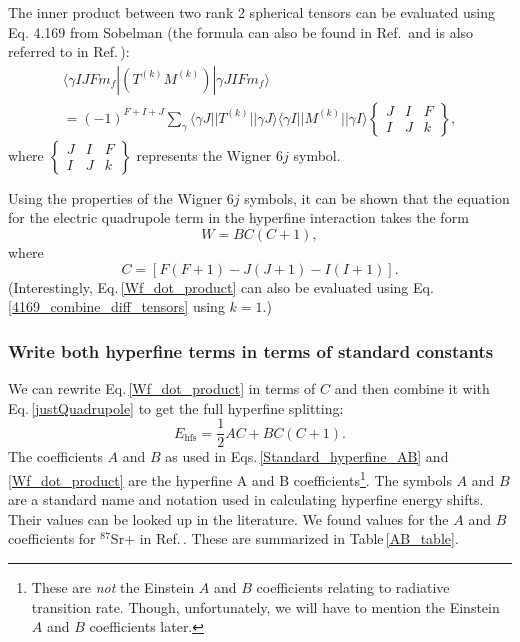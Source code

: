 The inner product between two rank 2 spherical tensors can be evaluated using Eq. 4.169 from Sobelman \cite{sobelman_spectra} (the formula can also be found in Ref.\,\cite{Racah2} and is also referred to in Ref.\,\cite{schwartz_hyperfine_expansion}):
\begin{multline}\label{4169_combine_diff_tensors}
\langle\gamma I J F m_f|(T^{(k)}M^{(k)})|\gamma J I F m_f\rangle \\
=
(-1)^{F+I+J} \sum_{\gamma} \langle\gamma J||T^{(k)}||\gamma J\rangle
\langle\gamma I || M^{(k)} ||\gamma I\rangle
\begin{Bmatrix}
J & I & F \\
I & J & k
\end{Bmatrix},
\end{multline}
where 
$\begin{Bmatrix}
J & I & F \\
I & J & k
\end{Bmatrix}$ represents the Wigner $6j$ symbol. 

Using the properties of the Wigner $6j$ symbols, it can be shown that %
the equation for the electric quadrupole term in the hyperfine interaction takes the form \cite{cuaMITnotes}\cite{sobelman_spectra} 
\begin{equation}\label{justQuadrupole}
W=BC(C+1),
\end{equation}
where 
\begin{equation}
C=[F(F+1)-J(J+1)-I(I+1)].
\end{equation}
(Interestingly, Eq.\,\ref{Wf_dot_product} can also be evaluated using Eq.\,\ref{4169_combine_diff_tensors} using $k=1$.)

\subsubsection{Write both hyperfine terms in terms of standard constants}
We can rewrite Eq.\,\eqref{Wf_dot_product} in terms of $C$ 
and then combine it with Eq.\,\eqref{justQuadrupole} to get the full hyperfine splitting\cite{cuaMITnotes}: 
\begin{equation}\label{Standard_hyperfine_AB}
E_{\mathrm{hfs}}=\frac{1}{2}AC+BC(C+1).
\end{equation}
The coefficients $A$ and $B$ as used in Eqs.\,\ref{Standard_hyperfine_AB} and \ref{Wf_dot_product} are the hyperfine A and B coefficients\footnote{These are \emph{not} the Einstein $A$ and $B$ coefficients relating to radiative transition rate. Though, unfortunately, we will have to mention the Einstein $A$ and $B$ coefficients later.}. The symbols $A$ and $B$ are a standard name and notation used in calculating hyperfine energy shifts. Their values can be looked up in the literature\cite{cuaMITnotes}.  We found values for the $A$ and $B$ coefficients for $^{87}$Sr+ in Ref.\,\cite{safronova2photon}. These are summarized in Table\,\ref{AB_table}.  

